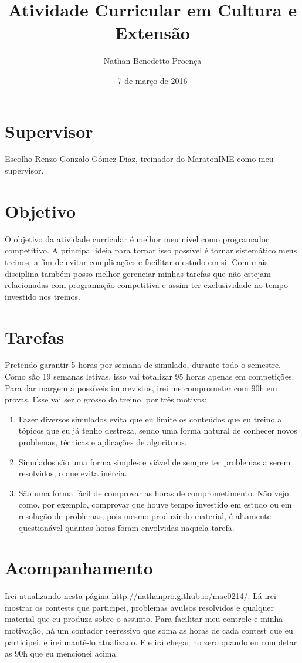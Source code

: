 \documentclass{article}
\title{Atividade Curricular em Cultura e Extensão}
\author{Nathan Benedetto Proença}
\date{7 de março de 2016}
\begin{document}
\maketitle
\section{Supervisor}
    Escolho Renzo Gonzalo Gómez Diaz, treinador do MaratonIME como meu supervisor.
\section{Objetivo}
    O objetivo da atividade curricular é melhor meu nível como programador
competitivo. A principal ideia para tornar isso possível é tornar sistemático
meus treinos, a fim de evitar complicações e facilitar o estudo em si. Com mais
disciplina também posso melhor gerenciar minhas tarefas que não estejam
relacionadas com programação competitiva e assim ter exclusividade no tempo
investido nos treinos.
\section{Tarefas}
    Pretendo garantir 5 horas por semana de simulado, durante todo o semestre.
Como são 19 semanas letivas, isso vai totalizar 95 horas apenas em competições.
Para dar margem a possíveis imprevistos, irei me comprometer com 90h em provas.
Esse vai ser o grosso do treino, por três motivos:
\begin{enumerate}
    \item Fazer diversos simulados evita que eu limite os conteúdos que eu
treino a tópicos que eu já tenho destreza, sendo uma forma natural de conhecer
novos problemas, técnicas e aplicações de algoritmos.
    \item Simulados são uma forma simples e viável de sempre ter problemas a
serem resolvidos, o que evita inércia.
    \item São uma forma fácil de comprovar as horas de comprometimento. Não vejo
como, por exemplo, comprovar que houve tempo investido em estudo ou em resolução
de problemas, pois mesmo produzindo material, é altamente questionável quantas 
horas foram envolvidas naquela tarefa.
\end{enumerate}
\section{Acompanhamento}
    Irei atualizando nesta página \url{http://nathanpro.github.io/mac0214/}.
Lá irei mostrar os contests que participei, problemas avulsos resolvidos e
qualquer material que eu produza sobre o assunto. Para facilitar meu controle
e minha motivação, há um contador regressivo que soma as horas de cada contest
que eu participei, e irei mantê-lo atualizado. Ele irá chegar no zero quando
eu completar as 90h que eu mencionei acima.
\end{document}
